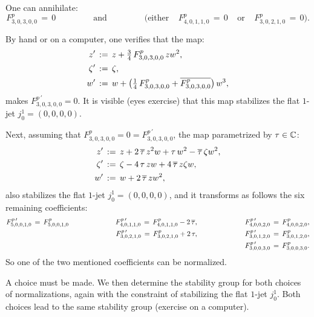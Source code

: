 \documentclass[12pt,twoside,leqno,openany]{amsart}
\begin{document}
\begin{Lemma}
\label{Lm-kill-F-30300-F40110}
One can annihilate:
\[
F_{3,0,3,0,0}^p
\,=\,
0
\ \ \ \ \ \ \ \ \ \ \ \ \ \ \ \ \ \ \ \
\text{and}
\ \ \ \ \ \ \ \ \ \ \ \ \ \ \ \ \ \ \ \
\Big(
\text{either}\ \ \ \ \
F_{4,0,1,1,0}^p
\,=\,
0
\ \ \ \ \ 
\text{or}
\ \ \ \ \ 
F_{3,0,2,1,0}^p
\,=\,
0
\Big).
\]
\end{Lemma}

\proof
By hand or on a computer, one verifies that the map:
\[
\aligned
z'
&
\,:=\,
z
+
\tfrac{3}{4}\,
F_{3,0,3,0,0}^p\,
zw^2,
\\
\zeta'
&
\,:=\,
\zeta,
\\
w'
&
\,:=\,
w
+
\big(
\tfrac{1}{4}\,
F_{3,0,3,0,0}^p
+
\overline{F_{3,0,3,0,0}^p}
\big)\,
w^3,
\endaligned
\]
makes $F_{3,0,3,0,0}^{p\,\prime} = 0$. It is visible (eyes exercise)
that this map stabilizes the flat $1$-jet $j_0^1 = (0, 0, 0, 0)$.

Next, assuming that $F_{3,0,3,0,0}^p = 0 = F_{3,0,3,0,0}^{p\,\prime}$,
the map parametrized by $\tau \in \mathbb{C}$:
\[
\aligned
z'
&
\,:=\,
z
+
2\,\overline{\tau}\,z^2w
+
\tau\,w^2
-
\overline{\tau}\,\zeta w^2,
\\
\zeta'
&
\,:=\,
\zeta
-
4\,\tau\,zw
+
4\,\overline{\tau}\,z\zeta w,
\\
w'
&
\,:=\,
w
+
2\,\overline{\tau}\,zw^2,
\endaligned
\]
also stabilizes the flat $1$-jet $j_0^1 = (0, 0, 0, 0)$, and it
transforms as follows the six remaining coefficients:
\[
\aligned
F_{5,0,0,1,0}^{p\,\prime}
\,=\,
F_{5,0,0,1,0}^p
\ \ \ \ \ \ \ \ \ \ \ \ \ \ \ \ \ \ \ \
F_{4,0,1,1,0}^{p\,\prime}
\,=\,
F_{4,0,1,1,0}^p
-
2\,\overline{\tau},
\ \ \ \ \ \ \ \ \ \ \ \ \ \ \ \ \ \ \ \
F_{4,0,0,2,0}^{p\,\prime}
\,=\,
F_{4,0,0,2,0}^p,
\\
F_{3,0,2,1,0}^{p\,\prime}
\,=\,
F_{3,0,2,1,0}^p
+
2\,\tau,
\ \ \ \ \ \ \ \ \ \ \ \ \ \ \ \ \ \ \ \
F_{3,0,1,2,0}^{p\,\prime}
\,=\,
F_{3,0,1,2,0}^p,
\\
F_{3,0,0,3,0}^{p\,\prime}
\,=\,
F_{3,0,0,3,0}^p.
\endaligned
\]
So one of the two mentioned coefficients can be normalized.
\endproof

A choice must be made. We then determine the stability group
for both choices of normalizations, again
with the constraint of stabilizing the flat $1$-jet $j_0^1$.
Both choices lead to the same 
stability group (exercise on a computer).
\end{document}
